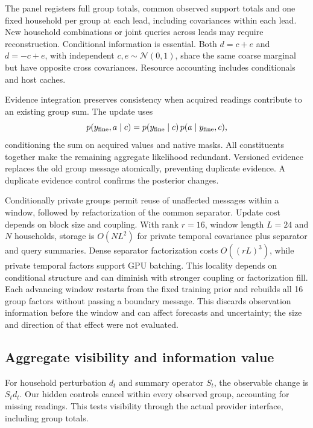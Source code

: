 \documentclass[conference]{IEEEtran}
\begin{document}
The panel registers full group totals, common observed support totals and one fixed household per group at each lead, including covariances within each lead. New household combinations or joint queries across leads may require reconstruction. Conditional information is essential. Both $d=c+e$ and $d=-c+e$, with independent $c,e\sim\mathcal N(0,1)$, share the same coarse marginal but have opposite cross covariances. Resource accounting includes conditionals and host caches.

Evidence integration preserves consistency when acquired readings contribute to an existing group sum. The update uses
\begin{equation}
p(y_{\rm fine},a\mid c)
=p(y_{\rm fine}\mid c)\,p(a\mid y_{\rm fine},c),\label{eq:replace}
\end{equation}
conditioning the sum on acquired values and native masks. All constituents together make the remaining aggregate likelihood redundant. Versioned evidence replaces the old group message atomically, preventing duplicate evidence. A duplicate evidence control confirms the posterior changes.

Conditionally private groups permit reuse of unaffected messages within a window, followed by refactorization of the common separator. Update cost depends on block size and coupling. With rank $r=16$, window length $L=24$ and $N$ households, storage is $O(NL^2)$ for private temporal covariance plus separator and query summaries. Dense separator factorization costs $O((rL)^3)$, while private temporal factors support GPU batching. This locality depends on conditional structure and can diminish with stronger coupling or factorization fill. Each advancing window restarts from the fixed training prior and rebuilds all 16 group factors without passing a boundary message. This discards observation information before the window and can affect forecasts and uncertainty; the size and direction of that effect were not evaluated.







\subsection{Aggregate visibility and information value}
For household perturbation $d_t$ and summary operator $S_t$, the observable change is $S_t d_t$. Our hidden controls cancel within every observed group, accounting for missing readings. This tests visibility through the actual provider interface, including group totals.
\end{document}
